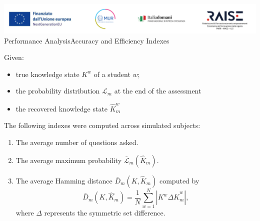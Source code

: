 \documentclass{beamer}
\begin{document}
\begin{frame}{\includegraphics[scale=0.4]{Da_cambiare.png} \\ 
Performance Analysis}{Accuracy and Efficiency Indexes}
\footnotesize
    \begin{block}{Given:}
    \begin{itemize}
        \item true knowledge state $K^w$ of a student $w$;
        \item the probability distribution $\mathcal{L}_{m}$ at the end of the assessment
        \item the recovered knowledge state $\hat{K}_m^w$ 
    \end{itemize}
    \end{block}
    \vspace{.2cm}
The following indexes were computed across simulated subjects: 
    \vspace{.2cm}
\begin{enumerate}
\item The {\color{blue}average number of questions asked}.
\item The {\color{blue}average maximum probability} $\bar{\mathcal{L}}_m ( \hat{K}_m )$.
	\item The {\color{blue}average Hamming distance} $\bar{D}_m(K,\hat{K}_m)$
	computed by
\[
\bar{D}_m(K,\hat{K}_m)=\frac{1}{N}\sum_{w=1}^N |K^w \Delta \hat{K}_m^w|,
\]
where $\Delta$ represents the symmetric set difference.

\end{enumerate}
\end{frame}
\end{document}
